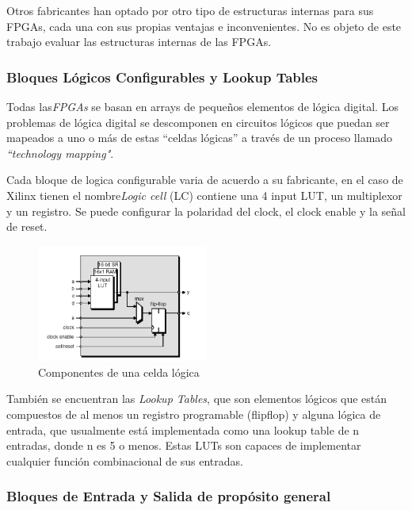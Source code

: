 Otros fabricantes han optado por otro tipo de estructuras internas para sus FPGAs, cada una con sus propias ventajas e inconvenientes. No es objeto de este trabajo evaluar las estructuras internas de las FPGAs.
		\subsubsection{Bloques Lógicos Configurables y Lookup Tables}

Todas las\textit{FPGAs} se basan en arrays de pequeños elementos de lógica digital. Los problemas de lógica digital se descomponen en circuitos lógicos que puedan ser mapeados a uno o más de estas “celdas lógicas” a través de un proceso llamado \textit{“technology mapping"}.

Cada bloque de logica configurable varia de acuerdo a su fabricante, en el caso de Xilinx tienen el nombre\textit{Logic cell} (LC) contiene una 4 input LUT, un multiplexor y un registro. Se puede configurar la polaridad del clock, el clock enable y la señal de reset.


\begin{figure}[h!]
 \begin{center}
 \includegraphics[width=0.5\textwidth,keepaspectratio=true]{./images/celda}
  \caption{Componentes de una celda lógica}
  \label{fig:esquema}
 \end{center}
\end{figure}

También se encuentran las \textit{Lookup Tables}, que son elementos lógicos que están compuestos de al menos un registro programable (flip\-flop) y alguna lógica de entrada, que usualmente está implementada como una lookup table de n entradas, donde n es 5 o menos. Estas LUTs son capaces de implementar cualquier función combinacional de sus entradas.

	\subsubsection{Bloques de Entrada y Salida de propósito general}

